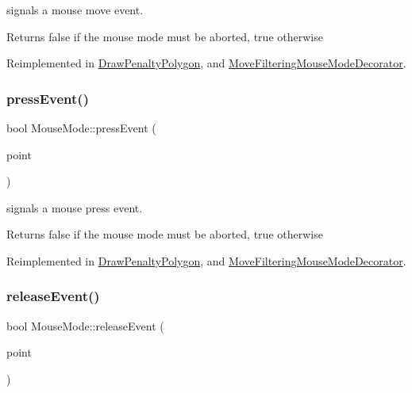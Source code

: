 signals a mouse move event. 

\begin{DoxyReturn}{Returns}
false if the mouse mode must be aborted, true otherwise 
\end{DoxyReturn}


Reimplemented in \mbox{\hyperlink{class_draw_penalty_polygon_a7532daff327db9c828c075ab13231058}{Draw\+Penalty\+Polygon}}, and \mbox{\hyperlink{class_move_filtering_mouse_mode_decorator_a9755a8c9d311a388199be9402d8f5e71}{Move\+Filtering\+Mouse\+Mode\+Decorator}}.

\mbox{\label{class_mouse_mode_ac726911a60e2cbd733d6d6a55d2ceba9}} 
\subsubsection{\texorpdfstring{pressEvent()}{pressEvent()}}
{\footnotesize\ttfamily bool Mouse\+Mode\+::press\+Event (\begin{DoxyParamCaption}\item[{const Q\+PointF \&}]{point }\end{DoxyParamCaption})\hspace{0.3cm}{\ttfamily [virtual]}}



signals a mouse press event. 

\begin{DoxyReturn}{Returns}
false if the mouse mode must be aborted, true otherwise 
\end{DoxyReturn}


Reimplemented in \mbox{\hyperlink{class_draw_penalty_polygon_a52d402862dd2cf9072c6451beee36dc0}{Draw\+Penalty\+Polygon}}, and \mbox{\hyperlink{class_move_filtering_mouse_mode_decorator_a78748a2dffb39087c8a5a16859b73615}{Move\+Filtering\+Mouse\+Mode\+Decorator}}.

\mbox{\label{class_mouse_mode_a9515661d7c29ab234b7e70d0fe7e5db0}} 
\subsubsection{\texorpdfstring{releaseEvent()}{releaseEvent()}}
{\footnotesize\ttfamily bool Mouse\+Mode\+::release\+Event (\begin{DoxyParamCaption}\item[{const Q\+PointF \&}]{point }\end{DoxyParamCaption})\hspace{0.3cm}{\ttfamily [virtual]}}



